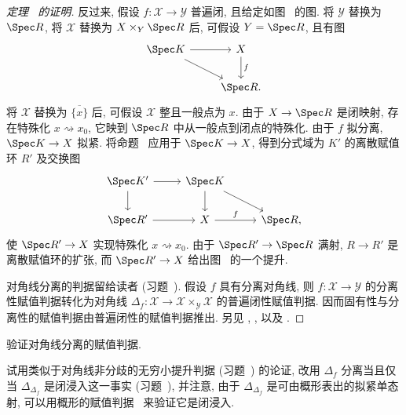 \begin{proof}[定理~ 的证明]
反过来, 假设 $f:\mathcal X\to\mathcal Y$ 普遍闭, 且给定如图~ 的图. 将 $\mathcal Y$ 替换为 $\Spec R$, 将 $\mathcal X$ 替换为 $\mathcal X\times_{\mathcal Y}\Spec R$ 后, 可假设 $\mathcal Y=\Spec R$, 且有图
\[
\begin{tikzcd}
\Spec K\arrow[r]\arrow[dr]&\mathcal X\arrow[d,"f"]\\
{}&\Spec R.
\end{tikzcd}
\]
将 $\mathcal X$ 替换为 $\overline{\{x\}}$ 后, 可假设 $\mathcal X$ 整且一般点为 $x$. 由于 $\mathcal X\to\Spec R$ 是闭映射, 存在特殊化 $x\rightsquigarrow x_0$, 它映到 $\Spec R$ 中从一般点到闭点的特殊化. 由于 $f$ 拟分离, $\Spec K\to\mathcal X$ 拟紧. 将命题~ 应用于 $\Spec K\to\mathcal X$, 得到分式域为 $K'$ 的离散赋值环 $R'$ 及交换图
\[
\begin{tikzcd}[column sep=2.5em]
\Spec K'\arrow[r]\arrow[d]&\Spec K\arrow[d]\arrow[dr]&{}\\
\Spec R'\arrow[r]&\mathcal X\arrow[r,"f"]&\Spec R,
\end{tikzcd}
\]
使 $\Spec R'\to\mathcal X$ 实现特殊化 $x\rightsquigarrow x_0$. 由于 $\Spec R'\to\Spec R$ 满射, $R\to R'$ 是离散赋值环的扩张, 而 $\Spec R'\to\mathcal X$ 给出图~ 的一个提升.

对角线分离的判据留给读者 (习题~). 假设 $f$ 具有分离对角线, 则 $f:\mathcal X\to\mathcal Y$ 的分离性赋值判据转化为对角线 $\Delta_f:\mathcal X\to\mathcal X\times_{\mathcal Y}\mathcal X$ 的普遍闭性赋值判据. 因而固有性与分离性的赋值判据由普遍闭性的赋值判据推出. 另见 \cite[定理 $7.10$]{LMB00}, \cite[\S$4$]{Fal03}, 以及 \cite[Tags 0CLQ, 0CLS, 0CLV, 0CLY]{SP}.
\end{proof}
\begin{exercise}\label{src:4.8.23}
验证对角线分离的赋值判据.

试用类似于对角线非分歧的无穷小提升判据 (习题~) 的论证, 改用 $\Delta_f$ 分离当且仅当 $\Delta_{\Delta_f}$ 是闭浸入这一事实 (习题~), 并注意, 由于 $\Delta_{\Delta_f}$ 是可由概形表出的拟紧单态射, 可以用概形的赋值判据~ 来验证它是闭浸入.
\end{exercise}
